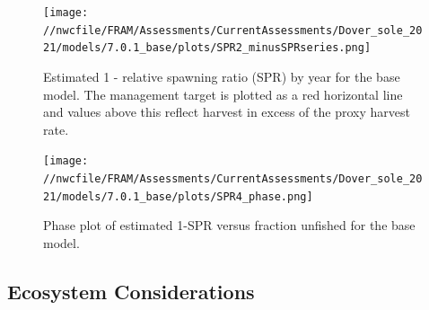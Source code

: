 \documentclass[11pt,
  english,
  a4paper,
]{article}
\begin{document}
\leavevmode\tagmcend\tagstructend\par




\begin{figure}
\centering
\texttt{[image: //nwcfile/FRAM/Assessments/CurrentAssessments/Dover\_sole\_2021/models/7.0.1\_base/plots/SPR2\_minusSPRseries.png]}
\caption{Estimated 1 - relative spawning ratio (SPR) by year for the base model. The management target is plotted as a red horizontal line and values above this reflect harvest in excess of the proxy harvest rate.\label{fig:es-1-spr}}
\end{figure}

\tagmcend\tagstructend


\begin{figure}
\centering
\texttt{[image: //nwcfile/FRAM/Assessments/CurrentAssessments/Dover\_sole\_2021/models/7.0.1\_base/plots/SPR4\_phase.png]}
\caption{Phase plot of estimated 1-SPR versus fraction unfished for the base model.\label{fig:es-phase}}
\end{figure}

\tagmcend\tagstructend


\hypertarget{ecosystem-considerations}{%
\subsection*{Ecosystem Considerations}\label{ecosystem-considerations}}

\leavevmode\tagmcend\tagstructend

\end{document}
